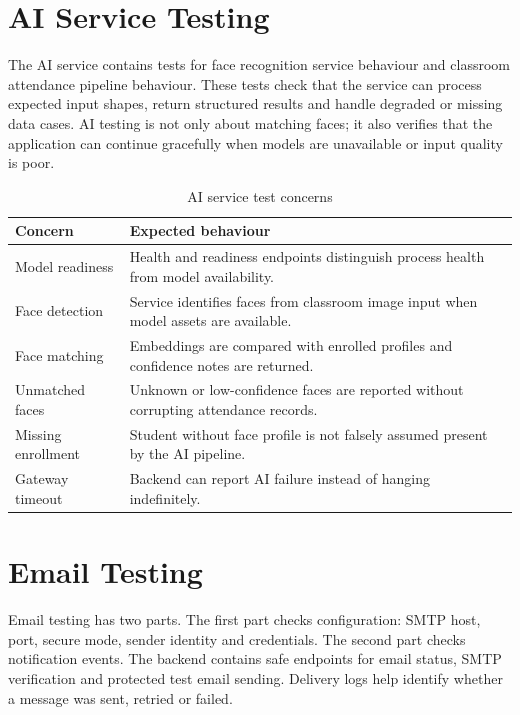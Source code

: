 \section{AI Service Testing}

The AI service contains tests for face recognition service behaviour and classroom attendance pipeline behaviour. These tests check that the service can process expected input shapes, return structured results and handle degraded or missing data cases. AI testing is not only about matching faces; it also verifies that the application can continue gracefully when models are unavailable or input quality is poor.

\begin{table}[H]
\centering
\caption{AI service test concerns}
\label{tab:ai-testing}
\begin{tabularx}{\textwidth}{p{3.3cm} X}
\toprule
\textbf{Concern} & \textbf{Expected behaviour}\\
\midrule
Model readiness & Health and readiness endpoints distinguish process health from model availability.\\
Face detection & Service identifies faces from classroom image input when model assets are available.\\
Face matching & Embeddings are compared with enrolled profiles and confidence notes are returned.\\
Unmatched faces & Unknown or low-confidence faces are reported without corrupting attendance records.\\
Missing enrollment & Student without face profile is not falsely assumed present by the AI pipeline.\\
Gateway timeout & Backend can report AI failure instead of hanging indefinitely.\\
\bottomrule
\end{tabularx}
\end{table}

\section{Email Testing}

Email testing has two parts. The first part checks configuration: SMTP host, port, secure mode, sender identity and credentials. The second part checks notification events. The backend contains safe endpoints for email status, SMTP verification and protected test email sending. Delivery logs help identify whether a message was sent, retried or failed.

